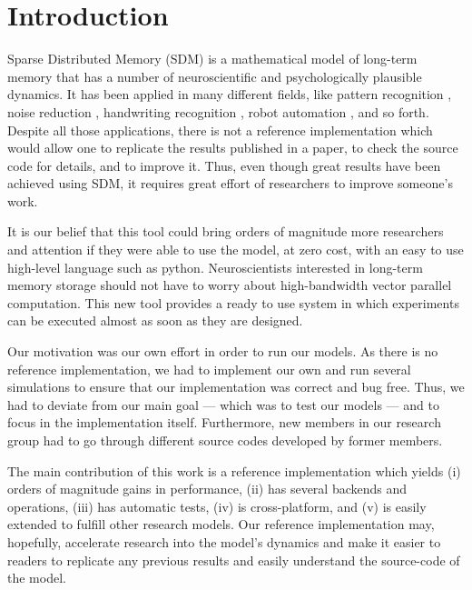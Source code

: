 
\chapter{Introduction}

Sparse Distributed Memory (SDM) \citep{Kanerva1988} is a mathematical model of long-term memory that has a number of neuroscientific and psychologically plausible dynamics. It has been applied in many different fields, like pattern recognition \citep{norman2003modeling, rao1995natural}, noise reduction \citep{Meng2009}, handwriting recognition \citep{fan1997genetic}, robot automation \citep{Rajesh1998, mendes2008robot}, and so forth. Despite all those applications, there is not a reference implementation which would allow one to replicate the results published in a paper, to check the source code for details, and to improve it. Thus, even though great results have been achieved using SDM, it requires great effort of researchers to improve someone's work.

It is our belief that this tool could bring orders of magnitude more researchers and attention if they were able to use the model, at zero cost, with an easy to use high-level language such as python. Neuroscientists interested in long-term memory storage should not have to worry about high-bandwidth vector parallel computation.  This new tool provides a ready to use system in which experiments can be executed almost as soon as they are designed.

Our motivation was our own effort in order to run our models. As there is no reference implementation, we had to implement our own and run several simulations to ensure that our implementation was correct and bug free. Thus, we had to deviate from our main goal --- which was to test our models --- and to focus in the implementation itself. Furthermore, new members in our research group had to go through different source codes developed by former members.

The main contribution of this work is a reference implementation which yields (i) orders of magnitude gains in performance, (ii) has several backends and operations, (iii) has automatic tests, (iv) is cross-platform, and (v) is easily extended to fulfill other research models. Our reference implementation may, hopefully, accelerate research into the model's dynamics and make it easier to readers to replicate any previous results and easily understand the source-code of the model.

